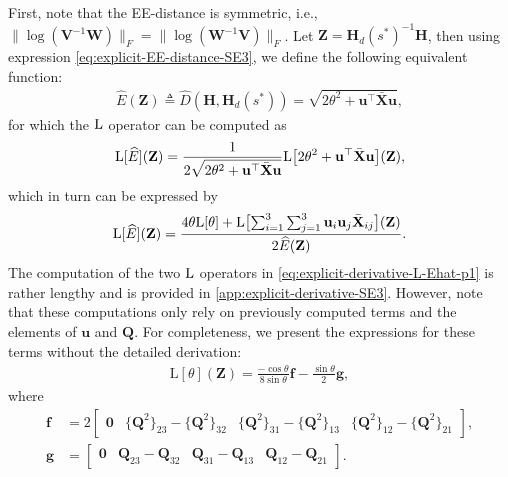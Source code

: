 First, note that the EE-distance is symmetric, i.e., $\bigl\|\log(\mathbf{V}^{-1}\mathbf{W})\bigr\|_F = \bigl\|\log(\mathbf{W}^{-1}\mathbf{V})\bigr\|_F$. Let $\mathbf{Z}=\mathbf{H}_d(s^*)^{-1}\mathbf{H}$, then using expression \eqref{eq:explicit-EE-distance-SE3}, we define the following equivalent function:
\begin{align}
    \widehat{E}(\mathbf{Z}) \triangleq \widehat{D}(\mathbf{H}, \mathbf{H}_d(s^*)) = \sqrt{2\theta^2 + \mathbf{u}^\top\bar{\mathbf{X}}\mathbf{u}},
    \label{eq:explicit-EE-dista-SE3-component-Ehat}
\end{align}
for which the $\operatorname{L}$ operator can be computed as
\begin{align}
    \operatorname{L}[\widehat{E}](\mathbf{Z}) = \frac{1}{2 \sqrt{2\theta^2 + \mathbf{u}^\top\bar{\mathbf{X}}\mathbf{u}}}\text{L}\bigl[2\theta^2 + \mathbf{u}^\top\bar{\mathbf{X}}\mathbf{u}\bigr](\mathbf{Z}),
\end{align}
which in turn can be expressed by 
\begin{align}
    \operatorname{L}[\widehat{E}](\mathbf{Z}) = \frac{4\theta\text{L}[\theta] + \operatorname{L}\bigl[\sum_{i=1}^{3}\sum_{j=1}^{3}\mathbf{u}_i\mathbf{u}_j\bar{\mathbf{X}}_{ij}\bigr](\mathbf{Z})}{2 \widehat{E}(\mathbf{Z})}. \label{eq:explicit-derivative-L-Ehat-p1}
\end{align}
The computation of the two $\operatorname{L}$ operators in \eqref{eq:explicit-derivative-L-Ehat-p1} is rather lengthy and is provided in \cref{app:explicit-derivative-SE3}. However, note that these computations only rely on previously computed terms and the elements of $\mathbf{u}$ and $\mathbf{Q}$. For completeness, we present the expressions for these terms without the detailed derivation:
\begin{align}
    \text{L}[\theta](\mathbf{Z}) = \frac{-\cos\theta}{8\sin\theta}\mathbf{f} - \frac{\sin\theta}{2}\mathbf{g},
    \label{eq:explicit-EE-dista-SE3-component-Ltheta}
\end{align}
where 
\begin{align}
    \mathbf{f} &= 2\begin{bmatrix}
        \mathbf{0}& \{\mathbf{Q}^2\}_{23}-\{\mathbf{Q}^2\}_{32} & \{\mathbf{Q}^2\}_{31} - \{\mathbf{Q}^2\}_{13} & \{\mathbf{Q}^2\}_{12}-\{\mathbf{Q}^2\}_{21}
    \end{bmatrix},\label{eq:explicit-EE-dista-SE3-component-fvec}\\
    \mathbf{g} &= \begin{bmatrix}
        \mathbf{0}& \mathbf{Q}_{23}-\mathbf{Q}_{32} & \mathbf{Q}_{31} - \mathbf{Q}_{13} & \mathbf{Q}_{12}-\mathbf{Q}_{21}
    \end{bmatrix} \label{eq:explicit-EE-dista-SE3-component-gvec}.
\end{align}
